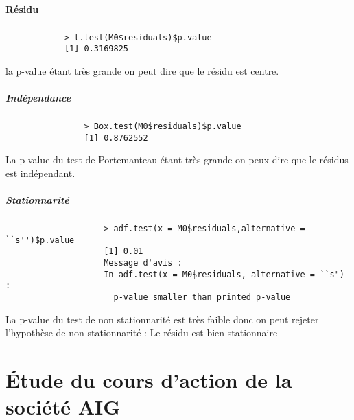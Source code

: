         \paragraph{Résidu}
            \subparagraph{}
            \begin{verbatim}
            > t.test(M0$residuals)$p.value
            [1] 0.3169825
            \end{verbatim}
            la p-value étant très grande on peut dire que le résidu est
           centre. 
            \subparagraph{Indépendance}
                \begin{verbatim}
                > Box.test(M0$residuals)$p.value
                [1] 0.8762552
                \end{verbatim}
                La p-value du test de Portemanteau étant très grande on peux dire
                que le résidus est indépendant.
            \subparagraph{Stationnarité}
                \begin{verbatim}
                    > adf.test(x = M0$residuals,alternative = ``s'')$p.value
                    [1] 0.01
                    Message d'avis :
                    In adf.test(x = M0$residuals, alternative = ``s") :
                      p-value smaller than printed p-value
                \end{verbatim}
                La p-value du test de non  stationnarité est très faible donc on
                peut rejeter l'hypothèse de non stationnarité : Le résidu est
                bien stationnaire

\section{Étude du cours d'action de la société AIG}
